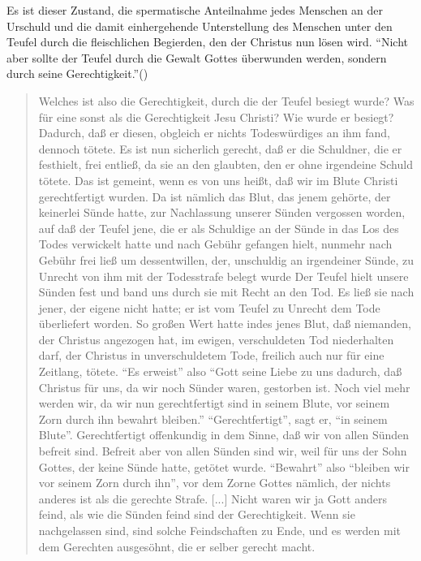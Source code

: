 Es ist dieser Zustand, die spermatische Anteilnahme jedes Menschen an der Urschuld und die damit einhergehende Unterstellung des Menschen unter den Teufel durch die fleischlichen Begierden, den der Christus nun lösen wird.
``Nicht aber sollte der Teufel durch die Gewalt Gottes überwunden werden, sondern durch seine Gerechtigkeit.''(\Cite[13.13(17)]{de-trinitate})
\begin{quote}
	Welches ist also die Gerechtigkeit, durch die der Teufel besiegt wurde?
	Was für eine sonst als die Gerechtigkeit Jesu Christi?
	Wie wurde er besiegt?
	Dadurch, daß er diesen, obgleich er nichts Todeswürdiges an ihm fand, dennoch tötete.
	Es ist nun sicherlich gerecht, daß er die Schuldner, die er festhielt, frei entließ, da sie an den glaubten, den er ohne irgendeine Schuld tötete.
	Das ist gemeint, wenn es von uns heißt, daß wir im Blute Christi gerechtfertigt wurden.
	 Da ist nämlich das Blut, das jenem gehörte, der keinerlei Sünde hatte, zur Nachlassung unserer Sünden vergossen worden,
	 auf daß der Teufel jene, die er als Schuldige an der Sünde in das Los des Todes verwickelt hatte und nach Gebühr gefangen hielt,
	 nunmehr nach Gebühr frei ließ um dessentwillen, der, unschuldig an irgendeiner Sünde, zu Unrecht von ihm mit der Todesstrafe belegt wurde
	 Der Teufel hielt unsere Sünden fest und band uns durch sie mit Recht an den Tod.
	 Es ließ sie nach jener, der eigene nicht hatte; er ist vom Teufel zu Unrecht dem Tode überliefert worden.
	 So großen Wert hatte indes jenes Blut, daß niemanden, der Christus angezogen hat, im ewigen, verschuldeten Tod niederhalten darf, der Christus in unverschuldetem Tode, freilich auch nur für eine Zeitlang, tötete.
	 ``Es erweist'' also ``Gott seine Liebe zu uns dadurch, daß Christus für uns, da wir noch Sünder waren, gestorben ist.
 Noch viel mehr werden wir, da wir nun gerechtfertigt sind in seinem Blute, vor seinem Zorn durch ihn bewahrt bleiben.''
	 ``Gerechtfertigt'', sagt er, ``in seinem Blute''.
	 Gerechtfertigt offenkundig in dem Sinne, daß wir von allen Sünden befreit sind.
	 Befreit aber von allen Sünden sind wir, weil für uns der Sohn Gottes, der keine Sünde hatte, getötet wurde.
	 ``Bewahrt'' also ``bleiben wir vor seinem Zorn durch ihn'', vor dem Zorne Gottes nämlich, der nichts anderes ist als die gerechte Strafe.
	 [...]
	 Nicht waren wir ja Gott anders feind, als wie die Sünden feind sind der Gerechtigkeit.
	 Wenn sie nachgelassen sind, sind solche Feindschaften zu Ende, und es werden mit dem Gerechten ausgesöhnt, die er selber gerecht macht.
\end{quote}
